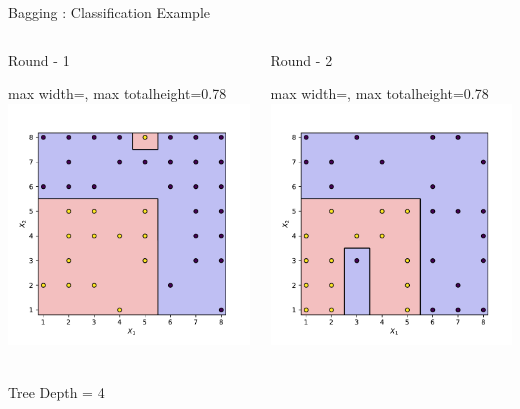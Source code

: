 \documentclass[aspectratio=169,10pt]{beamer}
\newcommand{\fitpic}[1]{\begin{adjustbox}{max width=\linewidth, max totalheight=0.78\textheight}#1\end{adjustbox}}
\begin{document}
\begin{frame}{Bagging : Classification Example}
  \vspace{0.2cm}
  \begin{columns}
    \pause\begin{column}{0.33\textwidth}\centering
      Round - 1\\
      \fitpic{\includegraphics[width=\linewidth]{../assets/ensemble/figures/decision-boundary-0}}\\
      Tree Depth = 4
    \end{column}
    \pause\begin{column}{0.33\textwidth}\centering
      Round - 2\\
      \fitpic{\includegraphics[width=\linewidth]{../assets/ensemble/figures/decision-boundary-1}}\\

\end{column}
\end{columns}
\end{frame}
\end{document}
